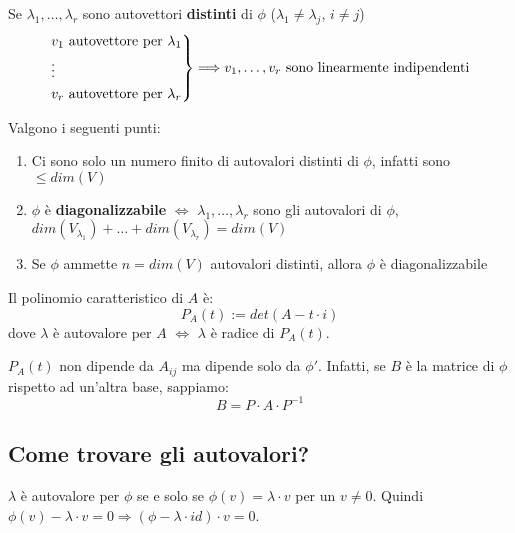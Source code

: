 \begin{proposition}
	Se $\lambda_{1}, \ldots, \lambda_{r}$ sono autovettori \textbf{distinti} di $\phi$ ($\lambda_{1} \neq \lambda_j$, $i \neq j$)
	\begin{equation*}
		\begin{rcases}
			v_1 \text{ autovettore per } \lambda_{1} \\
			\vdots \\
			v_r \text{ autovettore per } \lambda_{r} \\
		\end{rcases} \Longrightarrow v_1, \ldots, v_r \text{ sono linearmente indipendenti}
	\end{equation*}
\end{proposition}

\begin{corollary}Valgono i seguenti punti:
	\begin{enumerate}
		\item Ci sono solo un numero finito di autovalori distinti di $\phi$, infatti sono $\leq dim(V)$
		\item $\phi$ è \textbf{diagonalizzabile} $\Longleftrightarrow$ $\lambda_1, \ldots, \lambda_r$ sono gli autovalori di $\phi$, $dim(V_{\lambda_{1}}) + \ldots + dim(V_{\lambda_r}) = dim(V)$
		\item Se $\phi$ ammette $n = dim(V)$ autovalori distinti, allora $\phi$ è diagonalizzabile
 	\end{enumerate}
\end{corollary}

\begin{definition}
	Il polinomio caratteristico di $A$ è:
	\begin{equation*}
		P_A(t) := det(A-t \cdot i)
	\end{equation*}
	dove $\lambda$ è autovalore per $A$ $\Longleftrightarrow$ $\lambda$ è radice di $P_A(t)$.
\end{definition}

\begin{observation}
	$P_A(t)$ non dipende da $A_{ij}$ ma dipende solo da $\phi'$. Infatti, se $B$ è la matrice di $\phi$ rispetto ad un'altra base, sappiamo:
	\begin{equation*}
		B = P \cdot A \cdot P^{-1}
	\end{equation*}
\end{observation}

\subsection{Come trovare gli autovalori?}
$\lambda$ è autovalore per $\phi$ se e solo se $\phi(v) = \lambda \cdot v$ per un $v \neq 0$. Quindi $\phi(v) - \lambda \cdot v = 0 \Longrightarrow (\phi - \lambda \cdot id) \cdot v = 0$.

